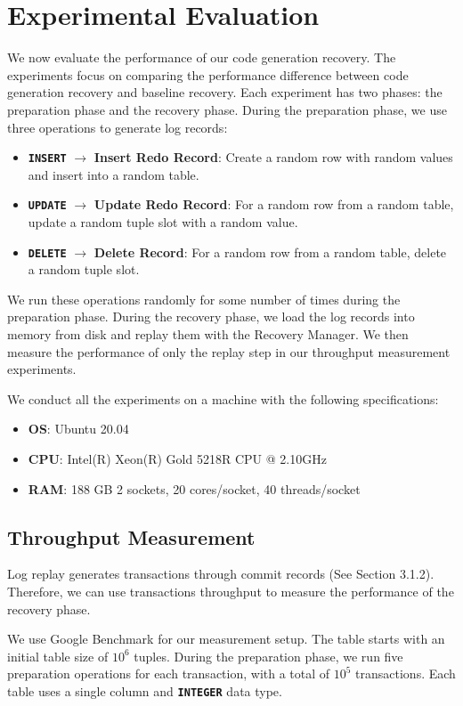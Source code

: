 \documentclass[12pt]{cmuthesis}
\newcommand{\dbSQL}[1]{\texttt{\textbf{#1}}\xspace}
\begin{document}
\chapter{Experimental Evaluation}
We now evaluate the performance of our code generation recovery. The experiments focus on comparing the performance difference between code generation recovery and baseline recovery. Each experiment has two phases: the preparation phase and the recovery phase. During the preparation phase, we use three operations to generate log records: 
\begin{itemize}
    \item \dbSQL{INSERT} $\rightarrow$ \textbf{Insert Redo Record}: Create a random row with random values and insert into a random table.
    \item \dbSQL{UPDATE} $\rightarrow$ \textbf{Update Redo Record}: For a random row from a random table, update a random tuple slot with a random value.
    \item \dbSQL{DELETE} $\rightarrow$ \textbf{Delete Record}: For a random row from a random table, delete a random tuple slot.
\end{itemize}
We run these operations randomly for some number of times during the preparation phase. During the recovery phase, we load the log records into memory from disk and replay them with the Recovery Manager. We then measure the performance of only the replay step in our throughput measurement experiments.

We conduct all the experiments on a machine with the following specifications:
\begin{itemize}
    \item \textbf{OS}: Ubuntu 20.04
    \item \textbf{CPU}: Intel(R) Xeon(R) Gold 5218R CPU @ 2.10GHz
    \item \textbf{RAM}: 188 GB 2 sockets, 20 cores/socket, 40 threads/socket
\end{itemize}

\section{Throughput Measurement}
Log replay generates transactions through commit records (See Section 3.1.2). Therefore, we can use transactions throughput to measure the performance of the recovery phase. 

We use Google Benchmark for our measurement setup. The table starts with an initial table size of $10^6$ tuples. During the preparation phase, we run five preparation operations for each transaction, with a total of $10^5$ transactions. Each table uses a single column and \dbSQL{INTEGER} data type.
\end{document}
